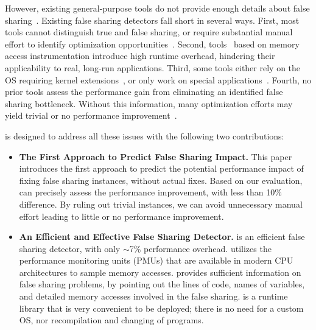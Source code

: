 However, existing general-purpose tools do not provide enough details about false sharing~\cite{gprof, ibs-sc, Intel:VTune}. Existing false sharing detectors fall short in several ways. First, most tools cannot distinguish true and false sharing, or require substantial manual effort to identify optimization opportunities~\cite{falseshare:binaryinstrumentation1,detect:ptu,detect:intel,falseshare:binaryinstrumentation2,DProf, OSdetection, mldetect, Wicaksono11detectingfalse, openmp}. Second, tools~\cite{falseshare:binaryinstrumentation1,falseshare:binaryinstrumentation2,falseshare:simulator, Predator, qinzhao} based on memory access instrumentation introduce high runtime overhead, hindering their applicability to real, long-run applications. Third, some tools either rely on the OS requiring kernel extensions~\cite{OSdetection}, or only work on special applications~\cite{Sheriff}. Fourth, no prior tools assess the performance gain from eliminating an identified false sharing bottleneck. Without this information, many optimization efforts may yield trivial or no performance improvement~\cite{Sheriff, qinzhao}.

\Cheetah{} is designed to address all these issues with the following two contributions:
\begin{itemize} 

\item {\bf The First Approach to Predict False Sharing Impact.} This paper introduces the first approach to predict the potential performance impact of fixing false sharing instances, without actual fixes. Based on our evaluation, \cheetah{} can precisely assess the performance improvement, with less than 10\% difference. By ruling out trivial instances, we can avoid unnecessary manual effort leading to little or no performance improvement. 

\item {\bf An Efficient and Effective False Sharing Detector.} \cheetah{} is an efficient false sharing detector, with only $\sim$7\% performance overhead. \Cheetah{} utilizes the performance monitoring units (PMUs) that are available in modern CPU architectures to sample memory accesses. \Cheetah{} provides sufficient information on false sharing problems, by pointing out the lines of code, names of variables, and detailed memory accesses involved in the false sharing. \Cheetah{} is a runtime library that is very convenient to be deployed; there is no need for a custom OS, nor recompilation and changing of programs. 

\end{itemize}

